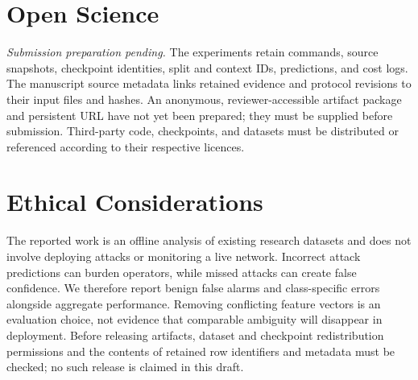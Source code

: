 \documentclass[sigconf,anonymous,pbalance]{acmart}
\begin{document}



\appendix
\section{Open Science}
\label{app:open-science}
\textit{Submission preparation pending.} The experiments retain commands, source snapshots, checkpoint identities, split and context IDs, predictions, and cost logs. The manuscript source metadata links retained evidence and protocol revisions to their input files and hashes. An anonymous, reviewer-accessible artifact package and persistent URL have not yet been prepared; they must be supplied before submission. Third-party code, checkpoints, and datasets must be distributed or referenced according to their respective licences.

\section{Ethical Considerations}
The reported work is an offline analysis of existing research datasets and does not involve deploying attacks or monitoring a live network. Incorrect attack predictions can burden operators, while missed attacks can create false confidence. We therefore report benign false alarms and class-specific errors alongside aggregate performance. Removing conflicting feature vectors is an evaluation choice, not evidence that comparable ambiguity will disappear in deployment. Before releasing artifacts, dataset and checkpoint redistribution permissions and the contents of retained row identifiers and metadata must be checked; no such release is claimed in this draft.
\end{document}
